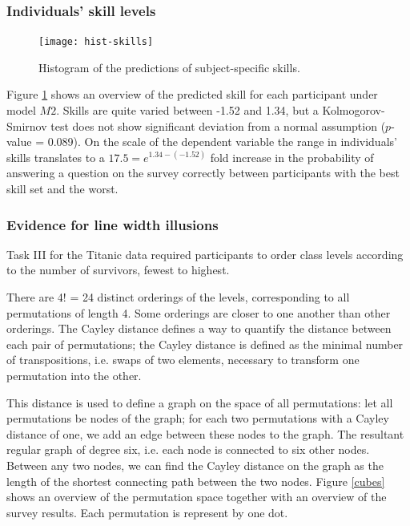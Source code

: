 \subsubsection*{Individuals' skill levels}
\begin{figure}
\centering \texttt{[image: hist-skills]}
\caption{\label{skills}Histogram of the predictions of subject-specific skills. }
\vspace{-0.2in}
\end{figure}	
Figure \ref{skills} shows an overview of the predicted skill for each participant under model $M2$. Skills are quite varied between  -1.52 and  1.34, but
a Kolmogorov-Smirnov test  does not show significant deviation from a normal assumption ($p$-value = 0.089).
On the scale of the dependent variable the range in individuals' skills translates to a $17.5 = e^{1.34 - (-1.52)}$ fold increase in the probability of answering a question on the survey correctly between participants with the best skill set and the worst.


\subsubsection*{Evidence for line width illusions}

Task III for the Titanic data required participants to order  class levels  according to the number of survivors, fewest to highest. 

There are 4! = 24 distinct orderings of the levels, corresponding to all permutations of length 4. Some orderings are closer to one another than other orderings.  
The Cayley distance defines a way to quantify the distance between  each pair of permutations; the Cayley distance is defined as the minimal number of transpositions, i.e. swaps of two elements,  necessary to transform one permutation into the other.

This distance is used to define a graph on the space of all permutations: let all permutations be nodes of the graph; for each two permutations with a Cayley distance of one, we add an edge between these nodes to the graph. The resultant regular graph of degree six, i.e. each  node is connected to six other nodes. Between any two nodes, we can find the Cayley distance on the graph as the length of the shortest connecting path between the two nodes.
Figure \ref{cubes} shows an overview of the permutation space together with an overview of the survey results. Each permutation is represent by one dot. 


